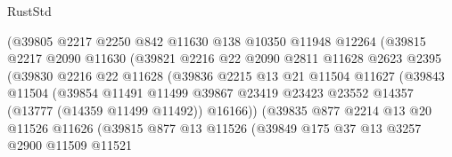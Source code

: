 \begin{lexlean}{RustStd}
\begin{coremodule}
                          (@39805
                            @2217
                            @2250
                            @842
                            @11630
                            @138
                            @10350
                            @11948
                            @12264
                            (@39815
                              @2217
                              @2090
                              @11630
                              (@39821
                                @2216
                                @22
                                @2090
                                @2811
                                @11628
                                @2623
                                @2395
                                (@39830
                                  @2216
                                  @22
                                  @11628
                                  (@39836
                                    @2215
                                    @13
                                    @21
                                    @11504
                                    @11627
                                    (@39843
                                      @11504
                                      (@39854
                                        @11491
                                        @11499
                                        @39867
                                        @23419
                                        @23423
                                        @23552
                                        @14357
                                        (@13777 (@14359 @11499 @11492))
                                        @16166))
                                    (@39835
                                      @877
                                      @2214
                                      @13
                                      @20
                                      @11526
                                      @11626
                                      (@39815
                                        @877
                                        @13
                                        @11526
                                        (@39849
                                          @175
                                          @37
                                          @13
                                          @3257
                                          @2900
                                          @11509
                                          @11521

\end{coremodule}
\end{lexlean}
